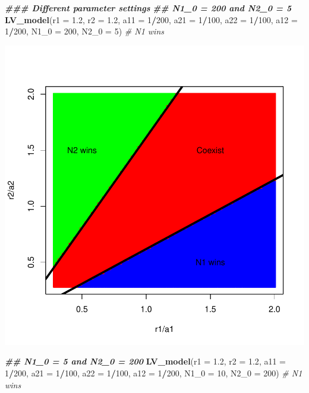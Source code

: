 \documentclass[
]{book}
\newenvironment{Shaded}{\begin{snugshade}}{\end{snugshade}}
\newcommand{\AttributeTok}[1]{\textcolor[rgb]{0.13,0.29,0.53}{#1}}
\newcommand{\CommentTok}[1]{\textcolor[rgb]{0.56,0.35,0.01}{\textit{#1}}}
\newcommand{\DecValTok}[1]{\textcolor[rgb]{0.00,0.00,0.81}{#1}}
\newcommand{\DocumentationTok}[1]{\textcolor[rgb]{0.56,0.35,0.01}{\textbf{\textit{#1}}}}
\newcommand{\FloatTok}[1]{\textcolor[rgb]{0.00,0.00,0.81}{#1}}
\newcommand{\FunctionTok}[1]{\textcolor[rgb]{0.13,0.29,0.53}{\textbf{#1}}}
\newcommand{\NormalTok}[1]{#1}
\newcommand{\SpecialCharTok}[1]{\textcolor[rgb]{0.81,0.36,0.00}{\textbf{#1}}}
\begin{document}
\begin{Shaded}
\begin{Highlighting}[]
  \DocumentationTok{\#\#\# Different parameter settings}
  \DocumentationTok{\#\# N1\_0 = 200 and N2\_0 = 5}
  \FunctionTok{LV\_model}\NormalTok{(}\AttributeTok{r1 =} \FloatTok{1.2}\NormalTok{, }\AttributeTok{r2 =} \FloatTok{1.2}\NormalTok{, }
           \AttributeTok{a11 =} \DecValTok{1}\SpecialCharTok{/}\DecValTok{200}\NormalTok{, }\AttributeTok{a21 =} \DecValTok{1}\SpecialCharTok{/}\DecValTok{100}\NormalTok{, }\AttributeTok{a22 =} \DecValTok{1}\SpecialCharTok{/}\DecValTok{100}\NormalTok{, }\AttributeTok{a12 =} \DecValTok{1}\SpecialCharTok{/}\DecValTok{200}\NormalTok{, }
           \AttributeTok{N1\_0 =} \DecValTok{200}\NormalTok{, }\AttributeTok{N2\_0 =} \DecValTok{5}\NormalTok{)  }\CommentTok{\# N1 wins}
\end{Highlighting}
\end{Shaded}

\includegraphics{bookdown-demo_files/figure-latex/unnamed-chunk-38-1.pdf}

\begin{Shaded}
\begin{Highlighting}[]
  \DocumentationTok{\#\# N1\_0 = 5 and N2\_0 = 200}
  \FunctionTok{LV\_model}\NormalTok{(}\AttributeTok{r1 =} \FloatTok{1.2}\NormalTok{, }\AttributeTok{r2 =} \FloatTok{1.2}\NormalTok{, }
           \AttributeTok{a11 =} \DecValTok{1}\SpecialCharTok{/}\DecValTok{200}\NormalTok{, }\AttributeTok{a21 =} \DecValTok{1}\SpecialCharTok{/}\DecValTok{100}\NormalTok{, }\AttributeTok{a22 =} \DecValTok{1}\SpecialCharTok{/}\DecValTok{100}\NormalTok{, }\AttributeTok{a12 =} \DecValTok{1}\SpecialCharTok{/}\DecValTok{200}\NormalTok{, }
           \AttributeTok{N1\_0 =} \DecValTok{10}\NormalTok{, }\AttributeTok{N2\_0 =} \DecValTok{200}\NormalTok{)  }\CommentTok{\# N1 wins}
\end{Highlighting}
\end{Shaded}
\end{document}
